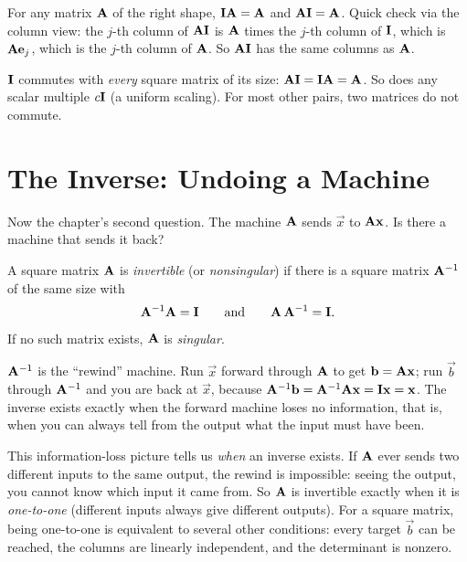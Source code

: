 For any matrix $\mathbf{A}$ of the right shape, $\mathbf{I}\mathbf{A} = \mathbf{A}$ and
$\mathbf{A}\mathbf{I} = \mathbf{A}$. Quick check via the column view: the $j$-th column of
$\mathbf{A}\mathbf{I}$ is $\mathbf{A}$ times the $j$-th column of $\mathbf{I}$, which is
$\mathbf{A}\mathbf{e}_j$, which is the $j$-th column of $\mathbf{A}$.
So $\mathbf{A}\mathbf{I}$ has the same columns as $\mathbf{A}$.

\begin{remark}
$\mathbf{I}$ commutes with \emph{every} square matrix of its size: $\mathbf{A}\mathbf{I} = \mathbf{I}\mathbf{A} = \mathbf{A}$. So does any scalar multiple $c\mathbf{I}$ (a uniform scaling).
For most other pairs, two matrices do not commute.
\end{remark}

\section{The Inverse: Undoing a Machine}
\label{ch08:inverse}

Now the chapter's second question. The machine $\mathbf{A}$ sends $\vec{x}$
to $\mathbf{A}\mathbf{x}$. Is there a machine that sends it back?

\begin{definition}
\label{ch08:inv-def}
A square matrix $\mathbf{A}$ is \emph{invertible} (or \emph{nonsingular}) if there is a
square matrix $\mathbf{A}^{-1}$ of the same size with
\[
\mathbf{A}^{-1} \mathbf{A} = \mathbf{I} \qquad\text{and}\qquad \mathbf{A}\,\mathbf{A}^{-1} = \mathbf{I}.
\]
If no such matrix exists, $\mathbf{A}$ is \emph{singular}.
\end{definition}

\begin{intuitionbox}
$\mathbf{A}^{-1}$ is the ``rewind'' machine. Run $\vec{x}$ forward through $\mathbf{A}$ to get
$\mathbf{b} = \mathbf{A}\mathbf{x}$; run $\vec{b}$ through $\mathbf{A}^{-1}$ and you are back at
$\vec{x}$, because $\mathbf{A}^{-1}\mathbf{b} = \mathbf{A}^{-1}\mathbf{A}\mathbf{x} = \mathbf{I}\mathbf{x} = \mathbf{x}$. The inverse exists exactly when the forward machine loses no information,
that is, when you can always tell from the output what the input must have been.
\end{intuitionbox}

This information-loss picture tells us \emph{when} an inverse exists. If
$\mathbf{A}$ ever sends two different inputs to the same output, the rewind is impossible:
seeing the output, you cannot know which input it came from. So $\mathbf{A}$ is invertible
exactly when it is \emph{one-to-one} (different inputs always give different outputs).
For a square matrix, being one-to-one is equivalent to several other conditions:
every target $\vec{b}$ can be reached, the columns are linearly independent, and the
determinant is nonzero.

